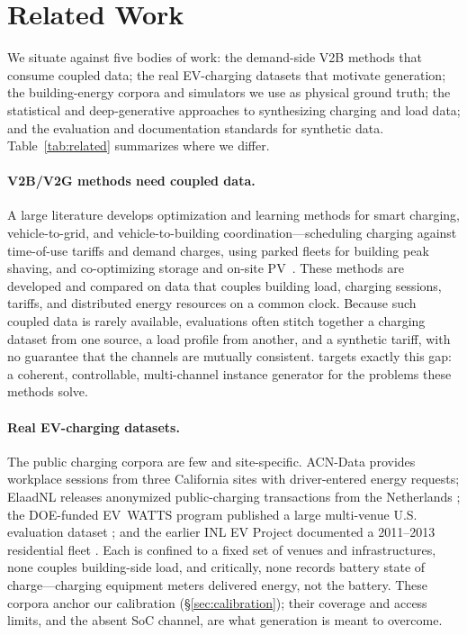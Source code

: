 \section{Related Work}
\label{sec:related}

We situate \generator{} against five bodies of work: the demand-side V2B
methods that consume coupled data; the real EV-charging datasets that
motivate generation; the building-energy corpora and simulators we use as
physical ground truth; the statistical and deep-generative approaches to
synthesizing charging and load data; and the evaluation and documentation
standards for synthetic data. Table~\ref{tab:related} summarizes where we
differ.

\paragraph{V2B/V2G methods need coupled data.}
A large literature develops optimization and learning methods for smart
charging, vehicle-to-grid, and vehicle-to-building coordination---scheduling
charging against time-of-use tariffs and demand charges, using parked fleets
for building peak shaving, and co-optimizing storage and on-site
PV~\citep{garciavillalobos2014smartcharging,tan2016v2g}. These methods
are developed and compared on data that couples building load, charging
sessions, tariffs, and distributed energy resources on a common clock.
Because such coupled data is rarely available, evaluations often stitch
together a charging dataset from one source, a load profile from another, and
a synthetic tariff, with no guarantee that the channels are mutually
consistent. \generator{} targets exactly this gap: a coherent, controllable,
multi-channel instance generator for the problems these methods solve.

\paragraph{Real EV-charging datasets.}
The public charging corpora are few and site-specific. ACN-Data
\citep{lee2019acn} provides workplace sessions from three California sites
with driver-entered energy requests; ElaadNL releases anonymized
public-charging transactions from the Netherlands \citep{elaadnl2020}; the
DOE-funded EV~WATTS program published a large multi-venue U.S. evaluation
dataset \citep{evwatts2023}; and the earlier INL EV Project documented a
2011--2013 residential fleet \citep{inl2015evproject}. Each is confined to a
fixed set of venues and infrastructures, none couples building-side load, and
critically, none records battery state of charge---charging equipment meters
delivered energy, not the battery. These corpora anchor our calibration
(\S\ref{sec:calibration}); their coverage and access limits, and the absent
SoC channel, are what generation is meant to overcome.

